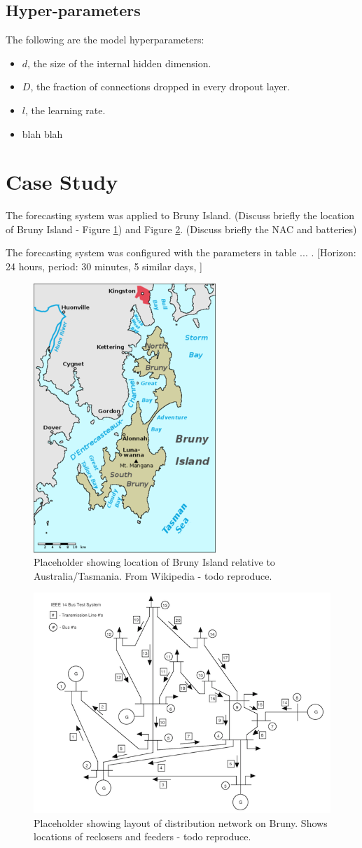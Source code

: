 \documentclass[conference]{IEEEtran}
\begin{document}
\subsection{Hyper-parameters}
The following are the model hyperparameters:
\begin{itemize}
	\item $d$, the size of the internal hidden dimension.
	\item $D$, the fraction of connections dropped in every dropout layer.
	\item $l$, the learning rate.
	\item blah blah 
\end{itemize}


\section{Case Study}
The forecasting system was applied to Bruny Island.
(Discuss briefly the location of Bruny Island - Figure \ref{fig:bruny_map}) and Figure \ref{fig:bruny_network}.
(Discuss briefly the NAC and batteries)

The forecasting system was configured with the parameters in table ... .
[Horizon: 24 hours, period: 30 minutes, 5 similar days, ]

\begin{figure}[htbp]
	\centerline{\includegraphics[width=.35\textwidth]{images/bruny_island_map.png}}
	\caption{Placeholder showing location of Bruny Island relative to Australia/Tasmania. From Wikipedia - todo reproduce.}
	\label{fig:bruny_map}
\end{figure}

\begin{figure}[htbp]
	\centerline{\includegraphics[width=.35\textwidth]{images/bruny_network.png}}
	\caption{Placeholder showing layout of distribution network on Bruny. Shows locations of reclosers and feeders - todo reproduce.}
	\label{fig:bruny_network}
\end{figure}
\end{document}
